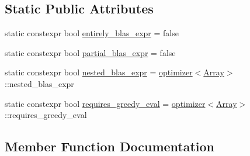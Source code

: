 \subsection*{Static Public Attributes}
\begin{DoxyCompactItemize}
\item 
static constexpr bool \hyperlink{structBC_1_1tensors_1_1exprs_1_1optimizer_3_01Unary__Expression_3_01Op_00_01Array_01_4_01_4_a1cc2734fb9f0e2df57f23cffde5e3374}{entirely\+\_\+blas\+\_\+expr} = false
\item 
static constexpr bool \hyperlink{structBC_1_1tensors_1_1exprs_1_1optimizer_3_01Unary__Expression_3_01Op_00_01Array_01_4_01_4_ad76e62b3cff6eec30950598ea588921d}{partial\+\_\+blas\+\_\+expr} = false
\item 
static constexpr bool \hyperlink{structBC_1_1tensors_1_1exprs_1_1optimizer_3_01Unary__Expression_3_01Op_00_01Array_01_4_01_4_ae1c7b207ee24dfcc60fb25db0ce35e5b}{nested\+\_\+blas\+\_\+expr} = \hyperlink{structBC_1_1tensors_1_1exprs_1_1optimizer}{optimizer}$<$\hyperlink{classBC_1_1tensors_1_1exprs_1_1Array}{Array}$>$\+::nested\+\_\+blas\+\_\+expr
\item 
static constexpr bool \hyperlink{structBC_1_1tensors_1_1exprs_1_1optimizer_3_01Unary__Expression_3_01Op_00_01Array_01_4_01_4_a1c767012af359a3fdd401f8e1a30e2e9}{requires\+\_\+greedy\+\_\+eval} = \hyperlink{structBC_1_1tensors_1_1exprs_1_1optimizer}{optimizer}$<$\hyperlink{classBC_1_1tensors_1_1exprs_1_1Array}{Array}$>$\+::requires\+\_\+greedy\+\_\+eval
\end{DoxyCompactItemize}


\subsection{Member Function Documentation}
